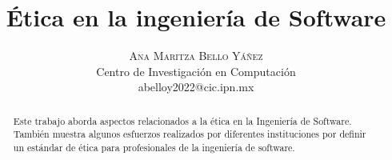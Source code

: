 \documentclass[twoside]{article}
\title{\vspace{-15mm}\fontsize{24pt}{10pt}\selectfont\textbf{Ética en la
ingeniería de Software}}
\author{
\large
\textsc{Ana Maritza Bello Yáñez} \\
\normalsize Centro de Investigación en Computación \\ 
\normalsize {abelloy2022@cic.ipn.mx}
\vspace{-5mm}
}
\date{}
\begin{document}
\maketitle %

\thispagestyle{fancy} %


\begin{abstract}

\noindent Este trabajo aborda aspectos relacionados a la ética en la Ingeniería
de Software. También muestra algunos esfuerzos realizados por diferentes
instituciones por definir un estándar de ética para profesionales de la
ingeniería de software.

\end{abstract}

\end{document}
